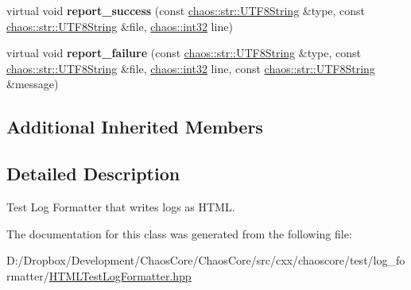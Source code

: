 \begin{DoxyCompactItemize}
\item 
\hypertarget{classchaos_1_1test_1_1log__formatter_1_1_h_t_m_l_test_log_formatter_a0a5e7371888b0fa9e741cebc5a333d8e}{}virtual void {\bfseries report\+\_\+success} (const \hyperlink{classchaos_1_1str_1_1_u_t_f8_string}{chaos\+::str\+::\+U\+T\+F8\+String} \&type, const \hyperlink{classchaos_1_1str_1_1_u_t_f8_string}{chaos\+::str\+::\+U\+T\+F8\+String} \&file, \hyperlink{namespacechaos_ad1de7efb430365afd2c9446a0f522a90}{chaos\+::int32} line)\label{classchaos_1_1test_1_1log__formatter_1_1_h_t_m_l_test_log_formatter_a0a5e7371888b0fa9e741cebc5a333d8e}

\item 
\hypertarget{classchaos_1_1test_1_1log__formatter_1_1_h_t_m_l_test_log_formatter_a9b37a5d07fcb6765b8be6f02765e6561}{}virtual void {\bfseries report\+\_\+failure} (const \hyperlink{classchaos_1_1str_1_1_u_t_f8_string}{chaos\+::str\+::\+U\+T\+F8\+String} \&type, const \hyperlink{classchaos_1_1str_1_1_u_t_f8_string}{chaos\+::str\+::\+U\+T\+F8\+String} \&file, \hyperlink{namespacechaos_ad1de7efb430365afd2c9446a0f522a90}{chaos\+::int32} line, const \hyperlink{classchaos_1_1str_1_1_u_t_f8_string}{chaos\+::str\+::\+U\+T\+F8\+String} \&message)\label{classchaos_1_1test_1_1log__formatter_1_1_h_t_m_l_test_log_formatter_a9b37a5d07fcb6765b8be6f02765e6561}

\end{DoxyCompactItemize}
\subsection*{Additional Inherited Members}


\subsection{Detailed Description}
Test Log Formatter that writes logs as H\+T\+M\+L. 

The documentation for this class was generated from the following file\+:\begin{DoxyCompactItemize}
\item 
D\+:/\+Dropbox/\+Development/\+Chaos\+Core/\+Chaos\+Core/src/cxx/chaoscore/test/log\+\_\+formatter/\hyperlink{_h_t_m_l_test_log_formatter_8hpp}{H\+T\+M\+L\+Test\+Log\+Formatter.\+hpp}\end{DoxyCompactItemize}
